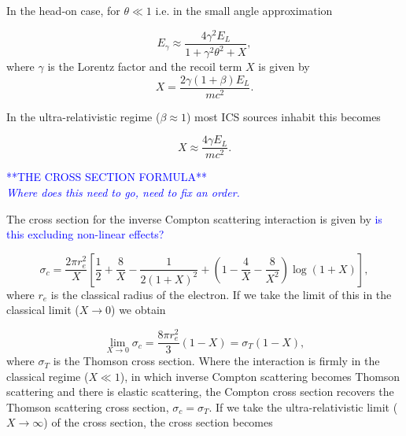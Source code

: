 \documentclass[../main.tex]{subfiles}
\begin{document}
In the head-on case, for $\theta \ll 1$ i.e. in the small angle approximation

\begin{equation}
E_{\gamma} \approx \frac{4\gamma^{2}E_{L}}{1+\gamma^{2}\theta^{2}+X},    
\label{eq:small_angle_scattered_photon_energy}
\end{equation}
where $\gamma$ is the Lorentz factor and the recoil term $X$ is given by
\begin{equation}
X = \frac{2\gamma\left(1+\beta\right)E_{L}}{mc^{2}}.
\label{eq:recoil_term}
\end{equation}

In the ultra-relativistic regime ($\beta \approx 1$) most ICS sources inhabit this becomes

\begin{equation}
X \approx \frac{4\gamma E_{L}}{mc^{2}}.
\label{eq:recoil_term_ultrarelativistic}    
\end{equation}

\textcolor{blue}{**THE CROSS SECTION FORMULA** \\ \textit{Where does this need to go, need to fix an order.}}

The cross section for the inverse Compton scattering interaction \cite{landau1982course} is given by \textcolor{blue}{is this excluding non-linear effects?}

\begin{equation}
 \sigma_{c} = \frac{2\pi r_{e}^{2}}{X}\left[\frac{1}{2}+\frac{8}{X}-\frac{1}{2\left(1+X\right)^{2}}+\left(1-\frac{4}{X}-\frac{8}{X^{2}}\right)\log{\left(1+X\right)}\right],
 \label{eq:compton_cross_section}
\end{equation}
where $r_{e}$ is the classical radius of the electron. If we take the limit of this in the classical limit ($X \to 0$) we obtain

\begin{equation}
\lim_{X \to 0} \sigma_{c} = \frac{8\pi r_{e}^{2}}{3}\left(1-X\right) = \sigma_{T}\left(1-X\right),
\label{eq:compton_cross_section_classical_limit}
\end{equation}
where $\sigma_{T}$ is the Thomson cross section. Where the interaction is firmly in the classical regime ($X \ll 1$), in which inverse Compton scattering becomes Thomson scattering and there is elastic scattering, the Compton cross section recovers the Thomson scattering cross section, $\sigma_{c} = \sigma_{T}$. If we take the ultra-relativistic limit ($X \to \infty$) of the cross section, the cross section becomes
\end{document}
